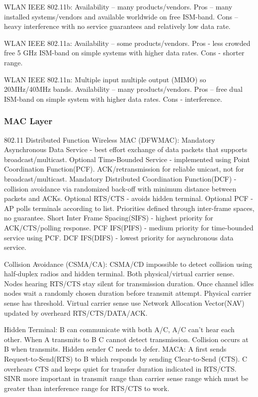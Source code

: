 \documentclass[8pt]{extarticle}
\begin{document}
\begin{multicols}{2}
WLAN IEEE 802.11b: Availability – many products/vendors. Pros – many installed systems/vendors and available worldwide on free ISM-band. Cons – heavy interference with no service guarantees and relatively low data rate.

WLAN IEEE 802.11a: Availability – some products/vendors. Pros - less crowded free 5 GHz ISM-band on simple systems with higher data rates. Cons - shorter range.

WLAN IEEE 802.11n: Multiple input multiple output (MIMO) so 20MHz/40MHz bands. Availability – many products/vendors. Pros – free dual ISM-band on simple system with higher data rates. Cons - interference.

\subsubsection{MAC Layer}

802.11 Distributed Function Wireless MAC (DFWMAC): Mandatory Asynchronous Data Service - best effort exchange of data packets  that supports broadcast/multicast. Optional Time-Bounded Service - implemented using Point Coordination Function(PCF). ACK/retransmission for reliable unicast, not for broadcast/multicast. Mandatory Distributed Coordination Function(DCF) - collision avoidance via randomized back-off with minimum distance between packets and ACKs. Optional RTS/CTS - avoids hidden terminal. Optional PCF - AP polls terminals according to list. Priorities defined through inter-frame spaces, no guarantee. Short Inter Frame Spacing(SIFS) - highest priority for ACK/CTS/polling response. PCF IFS(PIFS) - medium priority for time-bounded service using PCF. DCF IFS(DIFS) - lowest priority for asynchronous data service. 

Collision Avoidance (CSMA/CA): CSMA/CD impossible to detect collision using half-duplex radios and hidden terminal. Both physical/virtual carrier sense. Nodes hearing RTS/CTS stay silent for transmission duration. Once channel idles nodes wait a randomly chosen duration before transmit attempt. Physical carrier sense has threshold. Virtual carrier sense use Network Allocation Vector(NAV) updated by overheard
RTS/CTS/DATA/ACK.

Hidden Terminal: B can communicate with both A/C, A/C can't hear each other. When A transmits to B C cannot detect transmission. Collision occurs at B when transmits. Hidden sender C needs to defer. MACA: A first sends Request-to-Send(RTS) to B which responds by sending Clear-to-Send (CTS). C overhears CTS and keeps quiet for transfer duration indicated in RTS/CTS. SINR more important in transmit range than carrier sense range which must be greater than interference range for RTS/CTS to work.


\end{multicols}
\end{document}
